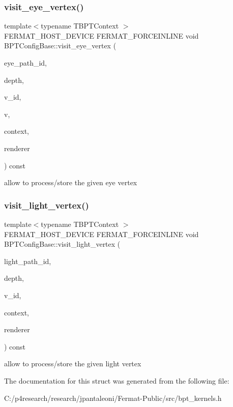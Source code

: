 \subsubsection{\texorpdfstring{visit\+\_\+eye\+\_\+vertex()}{visit\_eye\_vertex()}}
{\footnotesize\ttfamily template$<$typename T\+B\+P\+T\+Context $>$ \\
F\+E\+R\+M\+A\+T\+\_\+\+H\+O\+S\+T\+\_\+\+D\+E\+V\+I\+CE F\+E\+R\+M\+A\+T\+\_\+\+F\+O\+R\+C\+E\+I\+N\+L\+I\+NE void B\+P\+T\+Config\+Base\+::visit\+\_\+eye\+\_\+vertex (\begin{DoxyParamCaption}\item[{const uint32}]{eye\+\_\+path\+\_\+id,  }\item[{const uint32}]{depth,  }\item[{const \hyperlink{struct_vertex_geometry_id}{Vertex\+Geometry\+Id}}]{v\+\_\+id,  }\item[{const \hyperlink{struct_eye_vertex}{Eye\+Vertex} \&}]{v,  }\item[{T\+B\+P\+T\+Context \&}]{context,  }\item[{\hyperlink{struct_rendering_context_view}{Rendering\+Context\+View} \&}]{renderer }\end{DoxyParamCaption}) const\hspace{0.3cm}{\ttfamily [inline]}}

allow to process/store the given eye vertex \mbox{\label{struct_b_p_t_config_base_a9a948bffb4f173adc48f156d02d000bb}} 
\subsubsection{\texorpdfstring{visit\+\_\+light\+\_\+vertex()}{visit\_light\_vertex()}}
{\footnotesize\ttfamily template$<$typename T\+B\+P\+T\+Context $>$ \\
F\+E\+R\+M\+A\+T\+\_\+\+H\+O\+S\+T\+\_\+\+D\+E\+V\+I\+CE F\+E\+R\+M\+A\+T\+\_\+\+F\+O\+R\+C\+E\+I\+N\+L\+I\+NE void B\+P\+T\+Config\+Base\+::visit\+\_\+light\+\_\+vertex (\begin{DoxyParamCaption}\item[{const uint32}]{light\+\_\+path\+\_\+id,  }\item[{const uint32}]{depth,  }\item[{const \hyperlink{struct_vertex_geometry_id}{Vertex\+Geometry\+Id}}]{v\+\_\+id,  }\item[{T\+B\+P\+T\+Context \&}]{context,  }\item[{\hyperlink{struct_rendering_context_view}{Rendering\+Context\+View} \&}]{renderer }\end{DoxyParamCaption}) const\hspace{0.3cm}{\ttfamily [inline]}}

allow to process/store the given light vertex 

The documentation for this struct was generated from the following file\+:\begin{DoxyCompactItemize}
\item 
C\+:/p4research/research/jpantaleoni/\+Fermat-\/\+Public/src/bpt\+\_\+kernels.\+h\end{DoxyCompactItemize}
